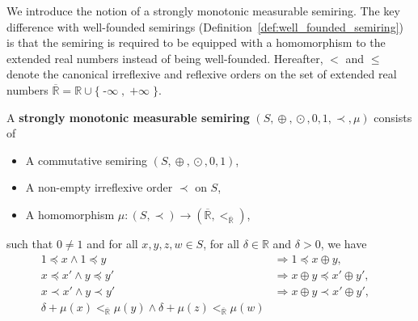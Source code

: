 We introduce the notion of a strongly monotonic measurable semiring.
The key difference with well-founded semirings (Definition~\ref{def:well_founded_semiring}) is that the semiring is required to be equipped with a homomorphism to the extended real numbers instead of being well-founded.
Hereafter, $<$ and $\leq$ denote the canonical irreflexive and reflexive orders on the set of extended real numbers $\overline{\mathbb{R}} \mathop{=} \mathbb{R} \mathop{\cup} \{\mathop{-\infty}, \mathop{+\infty}\}$.
\begin{definition} 
    \label{def:nwf:real_strongly_monotonic_semiring}
    A \textbf{strongly monotonic measurable semiring} $(S, \mathop{\oplus}, \mathop{\odot}, 0, 1, \prec, \mu)$ consists of
    \begin{itemize} 
        \item A commutative semiring $(S, \mathop{\oplus}, \mathop{\odot}, 0, 1)$,
        \item A non-empty irreflexive order $\prec$ on $S$,
        \item A homomorphism $\mu : (S, \prec) \mathop{\to} ( \overline{\mathbb{R}}, <_{\overline{\mathbb{R}}} )$,
    \end{itemize}
    such that $0 \mathop{\neq} 1$ and for all $x,y,z,w \mathop{\in} S$, for all $\delta \mathop{\in} \mathbb{R}$ and $\delta>0$, we have
        \begin{align*}
            1 \mathop{\preceq} x \mathop{\land} 1 \mathop{\preceq} y 
            &\mathop{\Rightarrow}
            1 \mathop{\preceq} x \mathop{\oplus} y,
            &\tag{S0} \label{ax:s0} 
            \\ 
            x \mathop{\preceq} x' \mathop{\land} y \mathop{\preceq} y' 
            &\mathop{\Rightarrow}
            x \mathop{\oplus} y \mathop{\preceq} x' \mathop{\oplus} y',
            &\tag{S1} \label{ax:s1} 
            \\   
            x \mathop{\prec} x' \mathop{\land} y \mathop{\prec} y'  
            &\mathop{\Rightarrow}
            x \mathop{\oplus} y \mathop{\prec} x' \mathop{\oplus} y',
            &\tag{S2} \label{ax:s2} 
            \\
            \delta\mathop{+}\mu(x) <_{\overline{\mathbb{R}}} \mu(y) \mathop{\land} \delta\mathop{+}\mu(z) <_{\overline{\mathbb{R}}} \mu(w)

\end{align*}
\end{definition}
